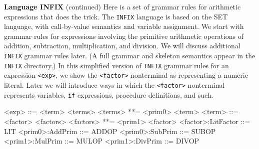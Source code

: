 \begin{minipage}[t]{\sw}
\slidenumber
\LARGE
{\bf Language INFIX} (continued)\exx
Here is a set of grammar rules
for arithmetic expressions that does the trick.
The \verb'INFIX' language is based on the SET language,
with call-by-value semantics and variable assignment.
We start with grammar rules for expressions involving
the primitive arithmetic operations
of addition, subtraction, multiplication, and division.
We will discuss additional \verb'INFIX' grammar rules later.
(A full grammar and skeleton semantics appear
in the \verb'INFIX' directory.)
In this simplified version of \verb'INFIX' grammar rules
for an expression \verb'<exp>',
we show the \verb'<factor>' nonterminal
as representing a numeric literal.
Later we will introduce ways in which
the \verb'<factor>' nonterminal represents
variables, \verb'if' expressions,
procedure definitions, and such.
{\Large
\begin{qv}
<exp>                ::= <term> <terms>
<terms>              **= <prim0> <term>
<term>               ::= <factor> <factors>
<factors>            **= <prim1> <factor>
<factor>:LitFactor   ::= LIT
<prim0>:AddPrim      ::= ADDOP
<prim0>:SubPrim      ::= SUBOP
<prim1>:MulPrim      ::= MULOP
<prim1>:DivPrim      ::= DIVOP
\end{qv}
}
\end{minipage}
